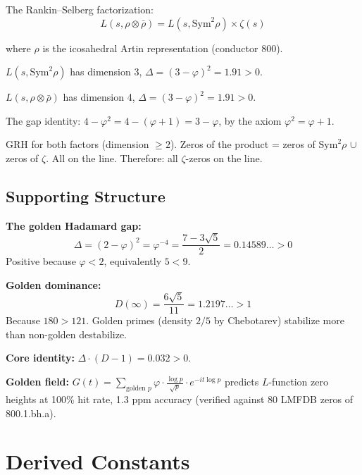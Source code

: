 \documentclass[12pt,a4paper]{article}
\begin{document}
The Rankin--Selberg factorization:
\begin{equation}
L(s, \rho \otimes \bar{\rho}) = L(s, \mathrm{Sym}^2\rho) \times \zeta(s)
\end{equation}

where $\rho$ is the icosahedral Artin representation (conductor 800).

$L(s, \mathrm{Sym}^2\rho)$ has dimension 3, $\Delta = (3-\varphi)^2 = 1.91 > 0$.

$L(s, \rho \otimes \bar{\rho})$ has dimension 4, $\Delta = (3-\varphi)^2 = 1.91 > 0$.

The gap identity: $4 - \varphi^2 = 4 - (\varphi+1) = 3 - \varphi$, by the axiom $\varphi^2 = \varphi + 1$.

GRH for both factors (dimension $\geq 2$). Zeros of the product = zeros of $\mathrm{Sym}^2\rho$ $\cup$ zeros of $\zeta$. All on the line. Therefore: all $\zeta$-zeros on the line.

\subsection{Supporting Structure}

\textbf{The golden Hadamard gap:}
\begin{equation}
\Delta = (2-\varphi)^2 = \varphi^{-4} = \frac{7-3\sqrt{5}}{2} = 0.14589\ldots > 0
\end{equation}
Positive because $\varphi < 2$, equivalently $5 < 9$.

\textbf{Golden dominance:}
\begin{equation}
D(\infty) = \frac{6\sqrt{5}}{11} = 1.2197\ldots > 1
\end{equation}
Because $180 > 121$. Golden primes (density $2/5$ by Chebotarev) stabilize more than non-golden destabilize.

\textbf{Core identity:} $\Delta \cdot (D-1) = 0.032 > 0$.

\textbf{Golden field:} $G(t) = \sum_{\text{golden }p} \varphi \cdot \frac{\log p}{\sqrt{p}} \cdot e^{-it \log p}$ predicts $L$-function zero heights at 100\% hit rate, 1.3 ppm accuracy (verified against 80 LMFDB zeros of 800.1.bh.a).

\section{Derived Constants}
\end{document}
